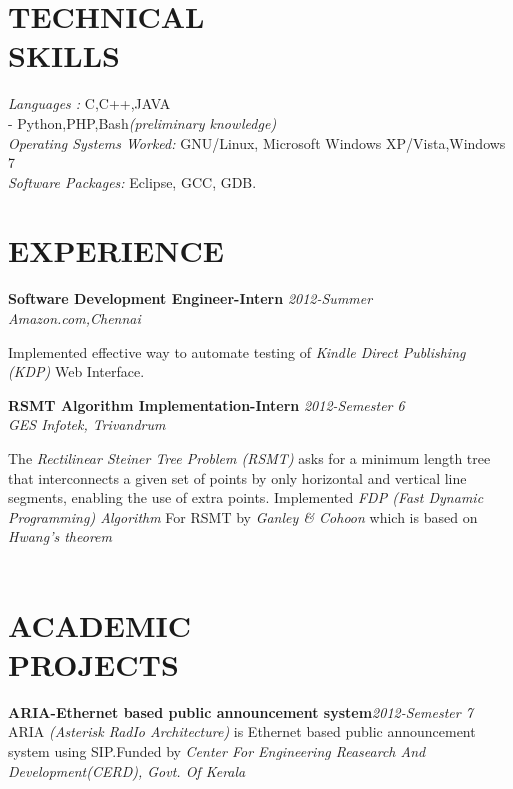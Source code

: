 \documentclass[line,margin]{res}
\begin{document}
\begin{resume}
	  \section{TECHNICAL \\ SKILLS} 
		  {\it Languages :} C,C++,JAVA\\-\hspace{15 mm} Python,PHP,Bash{\it (preliminary knowledge)}\\
		  {\it Operating Systems Worked:} GNU/Linux, Microsoft Windows XP/Vista,Windows 7\\
		  {\it Software Packages:} Eclipse, GCC, GDB.
		  
	  \section{EXPERIENCE}
		  {\bf Software Development Engineer-Intern }\hfill {\it 2012-Summer } \\
		  {\it Amazon.com,Chennai }
		  
		  Implemented effective way to automate testing of {\it Kindle Direct Publishing (KDP)} Web Interface.
		  
		  {\bf RSMT Algorithm Implementation-Intern }\hfill {\it 2012-Semester 6 } \\
		  {\it GES Infotek, Trivandrum }
		  
                  The {\it Rectilinear Steiner Tree Problem (RSMT)} asks for a minimum length tree that interconnects a given set of points by only horizontal and vertical line segments, enabling the use of extra points. Implemented {\it FDP (Fast Dynamic Programming) Algorithm } For RSMT by {\it Ganley \& Cohoon } which is based on {\it Hwang’s theorem}\\\\
	                  
	  \section{ACADEMIC \\ PROJECTS}
	    	  {\bf ARIA-Ethernet based public announcement system}\hfill {\it 2012-Semester 7}\\
	          
	    	  ARIA {\it (Asterisk RadIo Architecture)} is Ethernet based public announcement system using SIP.Funded by {\it Center For Engineering Reasearch And Development(CERD), Govt. Of Kerala}\\
	                          

\end{resume}
\end{document}
